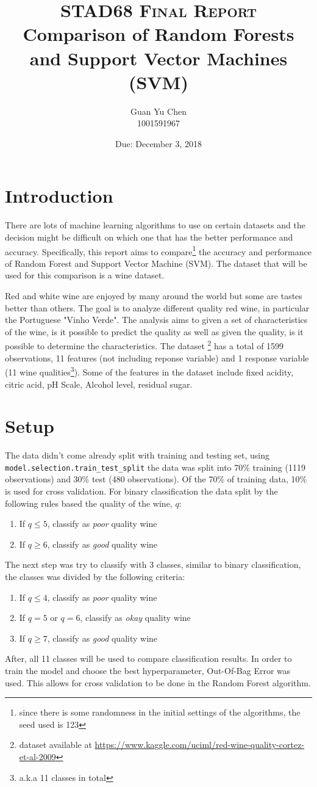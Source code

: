 \documentclass[11pt,a4paper,titlepage]{article}
\title{\textsc{STAD68 Final Report}\\ Comparison of Random Forests and Support Vector Machines (SVM)}
\author{Guan Yu Chen\\ 1001591967}
\date{Due: December 3, 2018}
\begin{document}
	\maketitle
	\section{Introduction}
	There are lots of machine learning algorithms to use on certain datasets and the decision might be difficult on which one that has the better performance and accuracy. Specifically, this report aims to compare\footnote{since there is some randomness in the initial settings of the algorithms, the seed used is 123} the accuracy and performance of Random Forest and Support Vector Machine (SVM). The dataset that will be used for this comparison is a wine dataset. 
	
	Red and white wine are enjoyed by many around the world but some are tastes better than others. The goal is to analyze different quality red wine, in particular the Portuguese "Vinho Verde". The analysis aims to given a set of characteristics of the wine, is it possible to predict the quality as well as given the quality, is it possible to determine the characteristics. The dataset \footnote{dataset available at \url{https://www.kaggle.com/uciml/red-wine-quality-cortez-et-al-2009}} has a total of 1599 observations, 11 features (not including reponse variable) and 1 response variable (11 wine qualities\footnote{a.k.a 11 classes in total}). Some of the features in the dataset include fixed acidity, citric acid, pH Scale, Alcohol level, residual sugar.
	\section{Setup}
	The data didn't come already split with training and testing set, using \texttt{model.selection.train\_test\_split} the data was split into 70\% training (1119 observations) and 30\% test (480 observations). Of the 70\% of training data, 10\% is used for cross validation. For binary classification the data split by the following rules based the quality of the wine, $q$:
	\begin{enumerate}
		\item If $q\leq 5$, classify as \textit{poor} quality wine
		\item If $q\geq 6$, classify as \textit{good} quality wine
	\end{enumerate}
	The next step was try to classify with 3 classes, similar to binary classification, the classes was divided by the following criteria:
	\begin{enumerate}
		\item If $q\leq 4$, classify as \textit{poor} quality wine
		\item If $q=5$ or $q=6$, classify as \textit{okay} quality wine
		\item If $q\geq 7$, classify as \textit{good} quality wine
	\end{enumerate}
	After, all 11 classes will be used to compare classification results. In order to train the model and choose the best hyperparameter, Out-Of-Bag Error was used. This allows for cross validation to be done in the Random Forest algorithm. 
\end{document}
